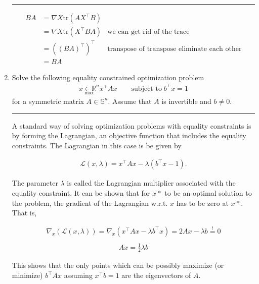 \documentclass[12pt]{article}
\begin{document}
\begin{enumerate}
    \noindent\rule{\linewidth}{1pt}
    \begin{align*}
        BA &= \nabla X \textrm{tr}(AX^\intercal B) \\
           &= \nabla X \textrm{tr}(X^\intercal BA) & \textrm{we can get rid of the trace}\\
           &= ((BA)^\intercal )^\intercal  & \textrm{transpose of transpose eliminate each other}\\
           &= BA
    \end{align*}

    \item Solve the following equality constrained optimization problem
    \begin{align*}
        \underset{\textrm{max}}{x \in \mathbb{R}^n} x^\intercal Ax \qquad \textrm{subject to} \; b^\intercal x=1
    \end{align*}
    for a symmetric matrix $A \in \mathbb{S}^n $. Assume that $A$ is invertible and $b \neq 0$. 

    \noindent\rule{\linewidth}{1pt}

    A standard way of solving optimization problems with equality constraints is by
    forming the Lagrangian, an objective function that includes the equality constraints.
    The Lagrangian in this case is be given by

    \begin{align*}
        \mathcal{L}(x, \lambda) = x^\intercal Ax - \lambda(b^\intercal x - 1).
    \end{align*}

    The parameter $\lambda$ is called the Lagrangian multiplier associated with the equality
    constraint. It can be shown that for $x*$ to be an optimal solution to the problem,
    the gradient of the Lagrangian w.r.t. $x$ has to be zero at $x*$. That is,

    \begin{align*}
        \nabla_x (\mathcal{L}(x, \lambda)) = \nabla_x (x^\intercal Ax - \lambda b^\intercal x) = 2Ax - \lambda b \overset{!}{=} 0 \\
    \end{align*}
    \begin{align*}
        Ax = \frac{1}{2} \lambda b
    \end{align*}
    
    This shows that the only points which can be possibly maximize (or minimize)
    $b^\intercal Ax$ assuming $x^\intercal b = 1$ are the eigenvectors of $A$.

\end{enumerate}
\end{document}
